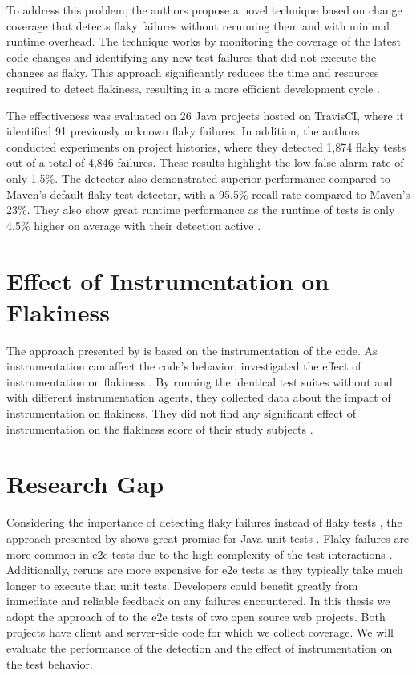 To address this problem, the authors propose a novel technique based on change coverage that detects flaky failures without rerunning them and with minimal runtime overhead.
The technique works by monitoring the coverage of the latest code changes and identifying any new test failures that did not execute the changes as flaky.
This approach significantly reduces the time and resources required to detect flakiness, resulting in a more efficient development cycle \autocite{bell_deflaker_2018}.

The effectiveness was evaluated on 26 Java projects hosted on TravisCI, where it identified 91 previously unknown flaky failures.
In addition, the authors conducted experiments on project histories, where they detected 1,874 flaky tests out of a total of 4,846 failures.
These results highlight the low false alarm rate of only 1.5\%.
The detector also demonstrated superior performance compared to Maven's default flaky test detector, with a 95.5\% recall rate compared to Maven's 23\%.
They also show great runtime performance as the runtime of tests is only 4.5\% higher on average with their detection active \autocite{bell_deflaker_2018}.

\section{Effect of Instrumentation on Flakiness}
The approach presented by \citeauthor*{bell_deflaker_2018} is based on the instrumentation of the code.
As instrumentation can affect the code's behavior, \citeauthor*{rasheed_effect_2023} investigated the effect of instrumentation on flakiness \autocite{rasheed_effect_2023}.
By running the identical test suites without and with different instrumentation agents, they collected data about the impact of instrumentation on flakiness.
They did not find any significant effect of instrumentation on the flakiness score of their study subjects \autocite{rasheed_effect_2023}.


\section{Research Gap}

Considering the importance of detecting flaky failures instead of flaky tests \autocite{haben_importance_2023}, the approach presented by \citeauthor*{bell_deflaker_2018} shows great promise for Java unit tests \autocite{bell_deflaker_2018}.
Flaky failures are more common in \ac{e2e} tests due to the high complexity of the test interactions \autocite{romano_empirical_2021}.
Additionally, reruns are more expensive for \ac{e2e} tests as they typically take much longer to execute than unit tests.
Developers could benefit greatly from immediate and reliable feedback on any failures encountered.
In this thesis we adopt the approach of \citeauthor*{bell_deflaker_2018} to the \ac{e2e} tests of two open source web projects.
Both projects have client and server-side code for which we collect coverage.
We will evaluate the performance of the detection and the effect of instrumentation on the test behavior.

